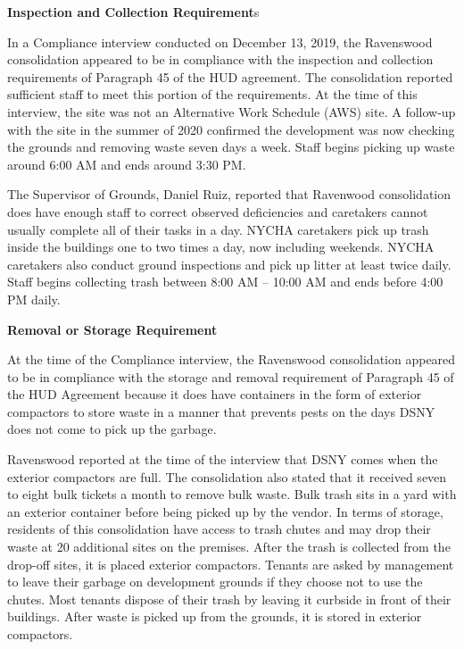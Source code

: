 
\textbf{Inspection and Collection Requirement}s



In a Compliance interview conducted on December 13, 2019, the Ravenswood consolidation appeared to be in compliance with the inspection and collection requirements of Paragraph 45 of the HUD agreement. The consolidation reported sufficient staff to meet this portion of the requirements. At the time of this interview, the site was not an Alternative Work Schedule (AWS) site. A follow-up with the site in the summer of 2020 confirmed the development was now checking the grounds and removing waste seven days a week. Staff begins picking up waste around 6:00 AM and ends around 3:30 PM.

The Supervisor of Grounds, Daniel Ruiz, reported that Ravenwood consolidation does have enough staff to correct observed deficiencies and caretakers cannot usually complete all of their tasks in a day. NYCHA caretakers pick up trash inside the buildings one to two times a day, now including weekends. NYCHA caretakers also conduct ground inspections and pick up litter at least twice daily. Staff begins collecting trash between 8:00 AM -- 10:00 AM and ends before 4:00 PM daily.

\textbf{Removal or Storage Requirement}



At the time of the Compliance interview, the Ravenswood consolidation appeared to be in compliance with the storage and removal requirement of Paragraph 45 of the HUD Agreement because it does have containers in the form of exterior compactors to store waste in a manner that prevents pests on the days DSNY does not come to pick up the garbage. 



Ravenswood reported at the time of the interview that DSNY comes when the exterior compactors are full. The consolidation also stated that it received seven to eight bulk tickets a month to remove bulk waste. Bulk trash sits in a yard with an exterior container before being picked up by the vendor. In terms of storage, residents of this consolidation have access to trash chutes and may drop their waste at 20 additional sites on the premises. After the trash is collected from the drop-off sites, it is placed exterior compactors. Tenants are asked by management to leave their garbage on development grounds if they choose not to use the chutes. Most tenants dispose of their trash by leaving it curbside in front of their buildings. After waste is picked up from the grounds, it is stored in exterior compactors. 



